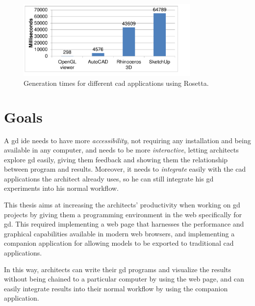 \begin{figure}
	\centering
	\includegraphics[width=0.8\textwidth]{images/carmo_rosetta_times}
	\caption{Generation times for different \gls{cad} applications using Rosetta.}
	\label{fig:carmo:times}
\end{figure}


\section{Goals}
A \gls{gd} \gls{ide} needs to have more \textit{accessibility}, not requiring any installation and being available in any computer, and needs to be more \textit{interactive}, letting architects explore \gls{gd} easily, giving them feedback and showing them the relationship between program and results.
Moreover, it needs to \textit{integrate} easily with the \gls{cad} applications the architect already uses, so he can still integrate his \gls{gd} experiments into his normal workflow.

This thesis aims at increasing the architects' productivity when working on \gls{gd} projects by giving them a programming environment in the web specifically for \gls{gd}.
This required implementing a web page that harnesses the performance and graphical capabilities available in modern web browsers, and implementing a companion application for allowing models to be exported to traditional \gls{cad} applications.

In this way, architects can write their \gls{gd} programs and visualize the results without being chained to a particular computer by using the web page, and can easily integrate results into their normal workflow by using the companion application.


